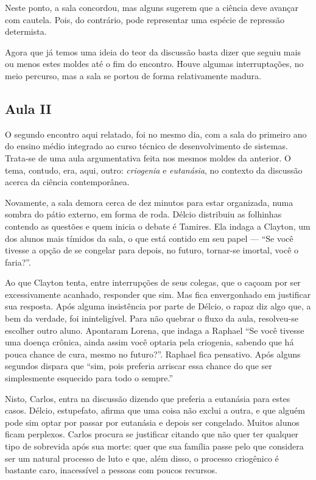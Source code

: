 \documentclass[12pt,a4paper]{article}
\begin{document}
    Neste ponto, a sala concordou, mas alguns sugerem que a ciência deve 
    avançar com cautela. Pois, do contrário, pode representar uma espécie de 
    repressão determista. 
    
    Agora que já temos uma ideia do teor da discussão basta dizer que seguiu 
    mais ou menos estes moldes até o fim do encontro. Houve algumas 
    interruptações, no meio percurso, mas a sala se portou de forma 
    relativamente madura. 

    \subsection*{Aula II}
    
    O segundo encontro aqui relatado, foi no mesmo dia, com a sala do primeiro 
    ano do ensino médio integrado ao curso técnico de desenvolvimento de 
    sistemas. Trata-se de uma aula argumentativa feita nos mesmos moldes da 
    anterior. O tema, contudo, era, aqui, outro: \textit{criogenia} e 
    \textit{eutanásia}, no contexto da discussão acerca da ciência 
    contemporânea. 
    
    Novamente, a sala demora cerca de dez minutos para estar organizada, 
    numa sombra do pátio externo, em forma de roda. Délcio distribuiu as 
    folhinhas contendo as questões e quem inicia o debate é Tamires. Ela indaga 
    a Clayton, um dos alunos mais tímidos da sala, o que está contido em seu 
    papel --- ``Se você tivesse a opção de se congelar para depois, no futuro,  
    tornar-se imortal, você o faria?''. 
    
    Ao que Clayton tenta, entre interrupções de seus colegas, que o caçoam por 
    ser excessivamente acanhado, responder que sim. Mas fica envergonhado em 
    justificar sua resposta. Após alguma insistência por parte de Délcio, 
    o rapaz diz algo que, a bem da verdade, foi ininteligível. Para não quebrar 
    o fluxo da aula, resolveu-se escolher outro aluno. Apontaram Lorena, que 
    indaga a Raphael ``Se você tivesse uma doença crônica, ainda assim 
    você optaria pela criogenia, sabendo que há pouca chance de cura, mesmo 
    no futuro?''. Raphael fica pensativo. Após alguns segundos dispara que 
    ``sim, pois preferia arriscar essa chance do que ser simplesmente 
    esquecido para todo o sempre.'' 
    
    Nisto, Carlos, entra na discussão dizendo que preferia a eutanásia para 
    estes casos. Délcio, estupefato, afirma que uma coisa não exclui a outra, 
    e que alguém pode sim optar por passar por eutanásia e depois ser congelado. 
    Muitos alunos ficam perplexos. Carlos procura se justificar citando que 
    não quer ter qualquer tipo de sobrevida após sua morte: quer que sua 
    família passe pelo que considera ser um natural processo de luto e que, 
    além disso, o processo criogênico é bastante caro, inacessível a pessoas 
    com poucos recursos. 
    
\end{document}
